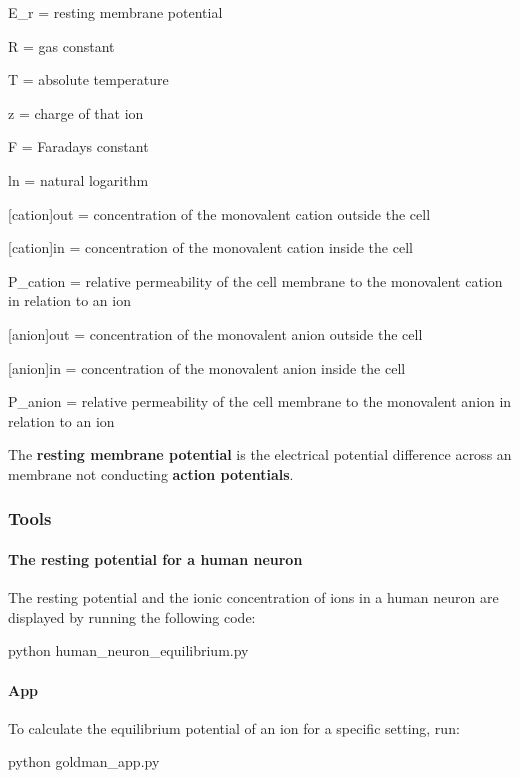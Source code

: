 \begin{DoxyItemize}
\item E\+\_\+r = resting membrane potential
\item R = gas constant
\item T = absolute temperature
\item z = charge of that ion
\item F = Faraday\textquotesingle{}s constant
\item ln = natural logarithm
\item \mbox{[}cation\mbox{]}out = concentration of the monovalent cation outside the cell
\item \mbox{[}cation\mbox{]}in = concentration of the monovalent cation inside the cell
\item P\+\_\+cation = relative permeability of the cell membrane to the monovalent cation in relation to an ion
\item \mbox{[}anion\mbox{]}out = concentration of the monovalent anion outside the cell
\item \mbox{[}anion\mbox{]}in = concentration of the monovalent anion inside the cell
\item P\+\_\+anion = relative permeability of the cell membrane to the monovalent anion in relation to an ion
\end{DoxyItemize}

The {\bfseries resting membrane potential} is the electrical potential difference across an membrane not conducting {\bfseries action potentials}.

\subsubsection*{Tools}

\paragraph*{The resting potential for a human neuron}

The resting potential and the ionic concentration of ions in a human neuron are displayed by running the following code\+:


\begin{DoxyCode}
python human\_neuron\_equilibrium.py
\end{DoxyCode}


\paragraph*{App}

To calculate the equilibrium potential of an ion for a specific setting, run\+:


\begin{DoxyCode}
python goldman\_app.py
\end{DoxyCode}
 